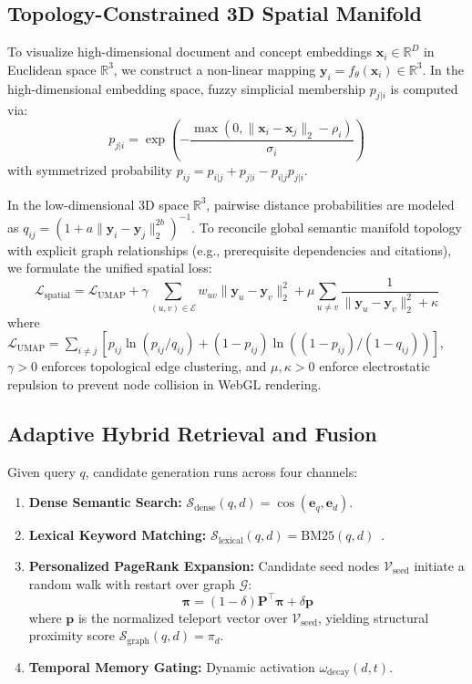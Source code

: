 \subsection{Topology-Constrained 3D Spatial Manifold}
To visualize high-dimensional document and concept embeddings $\mathbf{x}_i \in \mathbb{R}^D$ in Euclidean space $\mathbb{R}^3$, we construct a non-linear mapping $\mathbf{y}_i = f_\theta(\mathbf{x}_i) \in \mathbb{R}^3$. In the high-dimensional embedding space, fuzzy simplicial membership $p_{j|i}$ is computed via:
\begin{equation}
p_{j|i} = \exp\left( -\frac{\max(0, \|\mathbf{x}_i - \mathbf{x}_j\|_2 - \rho_i)}{\sigma_i} \right)
\end{equation}
with symmetrized probability $p_{ij} = p_{i|j} + p_{j|i} - p_{i|j}p_{j|i}$.

In the low-dimensional 3D space $\mathbb{R}^3$, pairwise distance probabilities are modeled as $q_{ij} = (1 + a \|\mathbf{y}_i - \mathbf{y}_j\|_2^{2b})^{-1}$. To reconcile global semantic manifold topology with explicit graph relationships (e.g., prerequisite dependencies and citations), we formulate the unified spatial loss:
\begin{equation}
\mathcal{L}_{\text{spatial}} = \mathcal{L}_{\text{UMAP}} + \gamma \sum_{(u, v) \in \mathcal{E}} w_{uv} \|\mathbf{y}_u - \mathbf{y}_v\|_2^2 + \mu \sum_{u \neq v} \frac{1}{\|\mathbf{y}_u - \mathbf{y}_v\|_2^2 + \kappa}
\label{eq:spatial_loss}
\end{equation}
where $\mathcal{L}_{\text{UMAP}} = \sum_{i \neq j} [p_{ij} \ln(p_{ij}/q_{ij}) + (1-p_{ij})\ln((1-p_{ij})/(1-q_{ij}))]$, $\gamma > 0$ enforces topological edge clustering, and $\mu, \kappa > 0$ enforce electrostatic repulsion to prevent node collision in WebGL rendering.

\subsection{Adaptive Hybrid Retrieval and Fusion}
Given query $q$, candidate generation runs across four channels:
\begin{enumerate}
    \item \textbf{Dense Semantic Search:} $\mathcal{S}_{\text{dense}}(q, d) = \cos(\mathbf{e}_q, \mathbf{e}_d)$.
    \item \textbf{Lexical Keyword Matching:} $\mathcal{S}_{\text{lexical}}(q, d) = \text{BM25}(q, d)$~\cite{robertson2009bm25}.
    \item \textbf{Personalized PageRank Expansion:} Candidate seed nodes $\mathcal{V}_{\text{seed}}$ initiate a random walk with restart over graph $\mathcal{G}$:
    \begin{equation}
    \mathbf{\pi} = (1 - \delta) \mathbf{P}^\top \mathbf{\pi} + \delta \mathbf{p}
    \end{equation}
    where $\mathbf{p}$ is the normalized teleport vector over $\mathcal{V}_{\text{seed}}$, yielding structural proximity score $\mathcal{S}_{\text{graph}}(q, d) = \pi_d$.
    \item \textbf{Temporal Memory Gating:} Dynamic activation $\omega_{\text{decay}}(d, t)$.
\end{enumerate}

